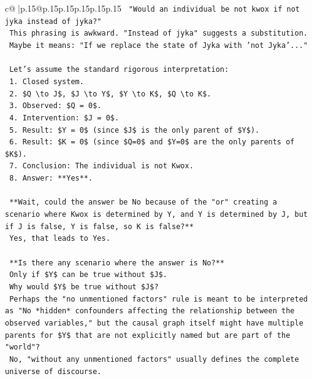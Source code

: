 \documentclass{article}
\begin{document}
{\begin{supertabular}{c@{$\;$}|p{.15\linewidth}@{}p{.15\linewidth}p{.15\linewidth}p{.15\linewidth}p{.15\linewidth}p{.15\linewidth}}
{{{\texttt{        "Would an individual be not kwox if not jyka instead of jyka?"} \\
\texttt{        This phrasing is awkward. "Instead of jyka" suggests a substitution.} \\
\texttt{        Maybe it means: "If we replace the state of Jyka with 'not Jyka'..."} \\
\\ 
\texttt{        Let's assume the standard rigorous interpretation:} \\
\texttt{        1. Closed system.} \\
\texttt{        2. \$Q \textbackslash{}to J\$, \$J \textbackslash{}to Y\$, \$Y \textbackslash{}to K\$, \$Q \textbackslash{}to K\$.} \\
\texttt{        3. Observed: \$Q = 0\$.} \\
\texttt{        4. Intervention: \$J = 0\$.} \\
\texttt{        5. Result: \$Y = 0\$ (since \$J\$ is the only parent of \$Y\$).} \\
\texttt{        6. Result: \$K = 0\$ (since \$Q=0\$ and \$Y=0\$ are the only parents of \$K\$).} \\
\texttt{        7. Conclusion: The individual is not Kwox.} \\
\texttt{        8. Answer: **Yes**.} \\
\\ 
\texttt{        **Wait, could the answer be No because of the "or" creating a scenario where Kwox is determined by Y, and Y is determined by J, but if J is false, Y is false, so K is false?**} \\
\texttt{        Yes, that leads to Yes.} \\
\\ 
\texttt{        **Is there any scenario where the answer is No?**} \\
\texttt{        Only if \$Y\$ can be true without \$J\$.} \\
\texttt{        Why would \$Y\$ be true without \$J\$?} \\
\texttt{        Perhaps the "no unmentioned factors" rule is meant to be interpreted as "No *hidden* confounders affecting the relationship between the observed variables," but the causal graph itself might have multiple parents for \$Y\$ that are not explicitly named but are part of the "world"?} \\
\texttt{        No, "without any unmentioned factors" usually defines the complete universe of discourse.} \\
}}}
\end{supertabular}}
\end{document}
